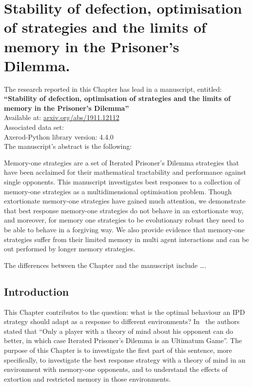 
\chapter{Stability of defection, optimisation of strategies and the limits of
       memory in the Prisoner's Dilemma.}\label{chapter:memory_one}

\begin{center}
    The research reported in this Chapter has lead in a manuscript, entitled: \\
    \textbf{``Stability of defection, optimisation of strategies and the limits of memory in the Prisoner's Dilemma''} \\
    Available at: \url{arxiv.org/abs/1911.12112} \\
    Associated data set: \cite{glynatsi2019} \\
    Axerod-Python library version: 4.4.0 \\ \vspace{.5cm}
    The manuscript's abstract is the following:  %
\end{center}

Memory-one strategies are a set of Iterated Prisoner's Dilemma strategies that
have been acclaimed for their mathematical tractability and performance against
single opponents. This manuscript investigates best responses to a collection of
memory-one strategies as a multidimensional optimisation problem. Though
extortionate memory-one strategies have gained much attention, we demonstrate
that best response memory-one strategies do not behave in an extortionate way,
and moreover, for memory one strategies to be evolutionary robust they need to
be able to behave in a forgiving way. We also provide evidence that memory-one
strategies suffer from their limited memory in multi agent interactions and can
be out performed by longer memory strategies.  %

\hrulefill

The differences between the Chapter and the manuscript include \dots.

\newpage

\section{Introduction}\label{section:mem_one_introduction}

This Chapter contributes to the question: what is the optimal behaviour an IPD
strategy should adapt as a response to different environments?
In~\cite{Press2012} the authors stated that ``Only a player with a theory of
mind about his opponent can do better, in which case Iterated Prisoner's Dilemma
is an Ultimatum Game''. The purpose of this Chapter is to investigate the first
part of this sentence, more specifically, to investigate the best response
strategy with a theory of mind in an environment with memory-one opponents, and
to understand the effects of extortion and restricted memory in those
environments.

